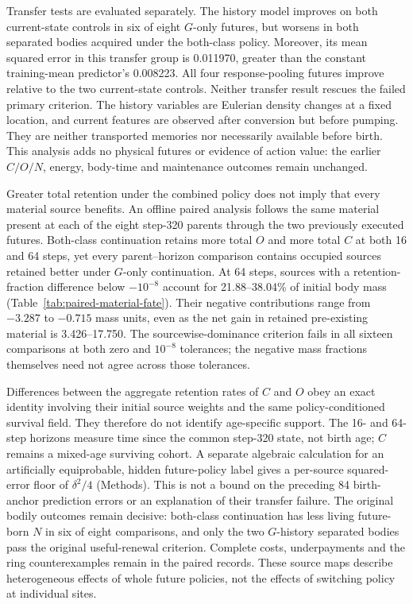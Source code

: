 Transfer tests are evaluated separately. The history model improves on both current-state controls in six of eight $G$-only futures, but worsens in both separated bodies acquired under the both-class policy. Moreover, its mean squared error in this transfer group is 0.011970, greater than the constant training-mean predictor's 0.008223. All four response-pooling futures improve relative to the two current-state controls. Neither transfer result rescues the failed primary criterion. The history variables are Eulerian density changes at a fixed location, and current features are observed after conversion but before pumping. They are neither transported memories nor necessarily available before birth. This analysis adds no physical futures or evidence of action value: the earlier $C/O/N$, energy, body-time and maintenance outcomes remain unchanged.



Greater total retention under the combined policy does not imply that every material source benefits. An offline paired analysis follows the same material present at each of the eight step-320 parents through the two previously executed futures. Both-class continuation retains more total $O$ and more total $C$ at both 16 and 64 steps, yet every parent--horizon comparison contains occupied sources retained better under $G$-only continuation. At 64 steps, sources with a retention-fraction difference below $-10^{-8}$ account for 21.88--38.04\% of initial body mass (Table~\ref{tab:paired-material-fate}). Their negative contributions range from $-3.287$ to $-0.715$ mass units, even as the net gain in retained pre-existing material is 3.426--17.750. The sourcewise-dominance criterion fails in all sixteen comparisons at both zero and $10^{-8}$ tolerances; the negative mass fractions themselves need not agree across those tolerances.

Differences between the aggregate retention rates of $C$ and $O$ obey an exact identity involving their initial source weights and the same policy-conditioned survival field. They therefore do not identify age-specific support. The 16- and 64-step horizons measure time since the common step-320 state, not birth age; $C$ remains a mixed-age surviving cohort. A separate algebraic calculation for an artificially equiprobable, hidden future-policy label gives a per-source squared-error floor of $\delta^2/4$ (Methods). This is not a bound on the preceding 84 birth-anchor prediction errors or an explanation of their transfer failure. The original bodily outcomes remain decisive: both-class continuation has less living future-born $N$ in six of eight comparisons, and only the two $G$-history separated bodies pass the original useful-renewal criterion. Complete costs, underpayments and the ring counterexamples remain in the paired records. These source maps describe heterogeneous effects of whole future policies, not the effects of switching policy at individual sites.

